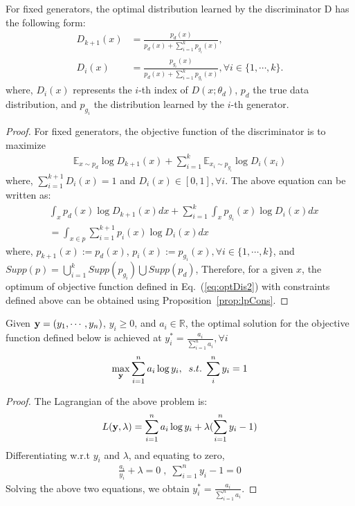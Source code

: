 \begin{corollary}
	\label{cor:optimalDiscrminator}
	For fixed generators, the optimal distribution learned by the discriminator D has the following form:
	\begin{align*}
		D_{k+1}(x) &=  \frac{p_d(x)}{p_d(x) + \sum_{i=1}^k p_{g_i}(x)}, \\ \nonumber
		D_i(x) &=  \frac{p_{g_i}(x)}{p_d(x) + \sum_{i=1}^k p_{g_i}(x)}, \forall i \in \{1, \cdots, k\}.
	\end{align*}
	where, $D_i(x)$ represents the $i$-th index of $D(x; \theta_d)$, $p_d$ the true data distribution, and $p_{g_i}$ the distribution learned by the $i$-th generator.
	\begin{proof}
		For fixed generators, the objective function of the discriminator is to maximize
		\begin{align*}
			\mathbb{E}_{x\sim p_{d}}\log D_{k+1}(x) + \sum_{i=1}^{k}\mathbb{E}_{x_i\sim p_{g_i}}\log D_i (x_i) 
		\end{align*}
		where, $\sum_{i=1}^{k+1} D_i(x) = 1$ and $D_i(x) \in [0, 1], \forall i$. The above equation can be written as:
		\begin{align}
			\label{eq:optDis2}
			& \int_x p_d(x)\log D_{k+1} (x) dx + \sum_{i=1}^k\int_x p_{g_i}(x)\log D_i(x) dx \nonumber \\
			& = \int_{x \in p} \sum_{i=1}^{k+1} p_i(x) \log D_i(x) dx
		\end{align}
		where, $p_{k+1}(x) := p_d(x)$, $p_i(x) := p_{g_i} (x), \forall i \in \{1, \cdots, k\}$, and $Supp(p) = \bigcup_{i=1}^k Supp(p_{g_i}) \bigcup Supp(p_d)$,   Therefore, for a given $x$, the optimum of objective function defined in Eq.~(\ref{eq:optDis2}) with constraints defined above can be obtained using Proposition~\ref{prop:lpCons}.
	\end{proof}
\end{corollary}

\begin{proposition}
	\label{prop:lpCons}
	Given ${\bf y} = (y_1, \cdots, y_n)$, $y_i \geq 0$, and $a_i \in \mathbb{R}$, the optimal solution for the objective function defined below is achieved at $y_i^* = \frac{a_i}{\sum_{i = 1}^n a_i}, \forall i$
	\begin{align*}
		\max_{\bf y} \sum_{i=1}^n a_i\log y_i,  \;\; s.t. \; \sum_i^n y_i = 1
	\end{align*}
	\begin{proof}
		The Lagrangian of the above problem is:
		\begin{align*}
			L({\bf y}, \lambda) = \sum_{i=1}^n a_i\log y_i + \lambda (\sum_{i=1}^n y_i - 1) 
		\end{align*}
		Differentiating w.r.t $y_i$ and $\lambda$, and equating to zero,
		\begin{align*}
			\frac{a_i}{y_i} + \lambda = 0 \; , \; \sum_{i=1}^n y_i - 1 = 0
		\end{align*}
		Solving the above two equations, we obtain $y_i^* = \frac{a_i}{\sum_{i = 1}^n a_i}$.
	\end{proof}
\end{proposition}

